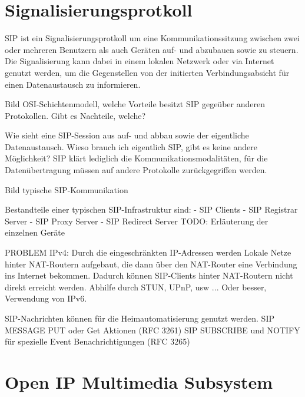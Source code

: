 \section{Signalisierungsprotkoll}

\ac{SIP} ist ein Signalisierungsprotkoll um eine Kommunikationssitzung zwischen zwei
oder mehreren Benutzern als auch Geräten auf- und abzubauen sowie zu steuern.
Die Signalisierung kann dabei in einem lokalen Netzwerk oder via Internet genutzt werden,
um die Gegenstellen von der initierten Verbindungsabsicht \zb für einen Datenaustausch
zu informieren.

Bild OSI-Schichtenmodell, welche Vorteile besitzt SIP gegeüber anderen Protokollen.
Gibt es \evtl Nachteile, welche?

Wie sieht eine SIP-Session aus auf- und abbau sowie der eigentliche Datenaustausch.
Wieso brauch ich eigentlich SIP, gibt es keine andere Möglichkeit?
SIP klärt lediglich die Kommunikationsmodalitäten, für die Datenübertragung müssen 
auf andere Protokolle zurückgegriffen werden.

Bild typische SIP-Kommunikation

Bestandteile einer typischen SIP-Infrastruktur sind:
- SIP Clients
- SIP Registrar Server
- SIP Proxy Server
- SIP Redirect Server
TODO: Erläuterung der einzelnen Geräte

PROBLEM IPv4: Durch die eingeschränkten IP-Adressen werden Lokale Netze hinter NAT-Routern 
aufgebaut, die dann über den NAT-Router eine Verbindung ins Internet bekommen.
Dadurch können SIP-Clients hinter NAT-Routern nicht direkt erreicht werden.
Abhilfe durch STUN, UPnP, usw ...
Oder besser, Verwendung von IPv6.

SIP-Nachrichten können für die Heimautomatisierung genutzt werden.
SIP MESSAGE PUT oder Get Aktionen (RFC 3261)
SIP SUBSCRIBE und NOTIFY für spezielle Event Benachrichtigungen (RFC 3265)


\section{Open IP Multimedia Subsystem}
 